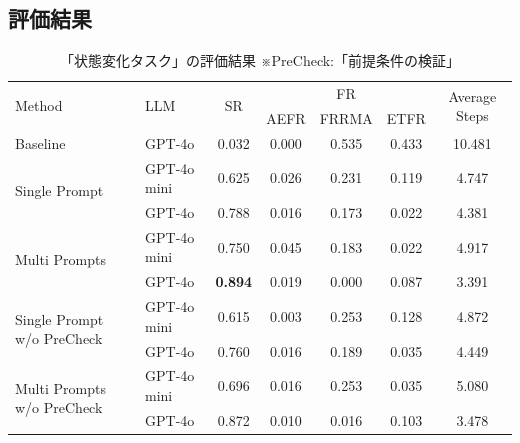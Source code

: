 \subsection{評価結果}\label{sec5.4}
\begin{table}[tb]
    \caption{「状態変化タスク」の評価結果  ※PreCheck:「前提条件の検証」}
    \label{result1}
    \centering
    \begin{tabular}{llccccc}
    \hline
         \multirow{2}{*}{Method} & \multirow{2}{*}{LLM} & \multirow{2}{*}{SR} & \multicolumn{3}{c}{FR} & \multirow{2}{*}{Average Steps}\\
          & & & AEFR & FRRMA & ETFR\\
    \hline
         Baseline~\cite{huang22} & GPT-4o & 0.032 & 0.000 & 0.535 & 0.433 & 10.481\\
    \hline    
         \multirow{2}{*}{Single Prompt} & GPT-4o mini & 0.625 & 0.026 & 0.231 & 0.119 & 4.747\\
         & GPT-4o & 0.788 & 0.016 & 0.173 & 0.022 & 4.381\\
         
         \multirow{2}{*}{Multi Prompts} & GPT-4o mini & 0.750 & 0.045 & 0.183 & 0.022 & 4.917\\
         & GPT-4o & \textbf{0.894} & 0.019 & 0.000 & 0.087 & 3.391\\
    \hline
        \multirow{2}{*}{Single Prompt w/o PreCheck} & GPT-4o mini & 0.615 & 0.003 & 0.253 & 0.128 & 4.872\\
         & GPT-4o & 0.760 & 0.016 & 0.189 & 0.035 & 4.449\\
         
         \multirow{2}{*}{Multi Prompts w/o PreCheck} & GPT-4o mini & 0.696 & 0.016 & 0.253 & 0.035 & 5.080\\
         & GPT-4o & 0.872 & 0.010 & 0.016 & 0.103 & 3.478\\
    \hline
    \end{tabular}
\end{table}

